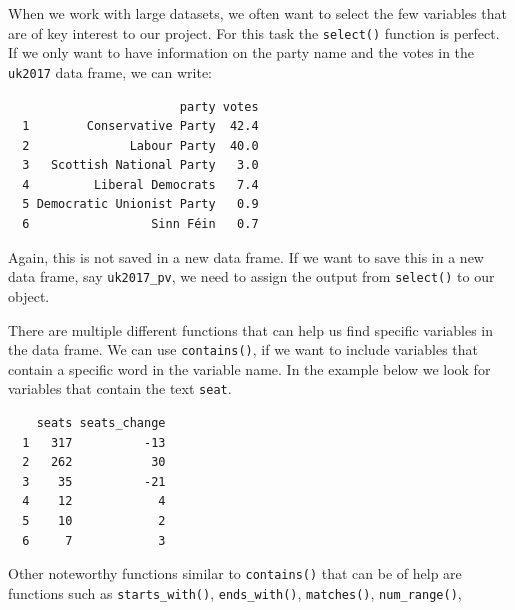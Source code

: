 \documentclass[12pt,oneside]{reedthesis}
\theoremstyle{definition}
\theoremstyle{definition}
\theoremstyle{definition}
\theoremstyle{remark}
\begin{document}
  When we work with large datasets, we often want to select the few
  variables that are of key interest to our project. For this task the
  \texttt{select()} function is perfect. If we only want to have
  information on the party name and the votes in the \texttt{uk2017} data
  frame, we can write:
  \begin{Shaded}
  \begin{Highlighting}[]
  \end{Highlighting}
  \end{Shaded}
  \begin{verbatim}
                        party votes
  1        Conservative Party  42.4
  2              Labour Party  40.0
  3   Scottish National Party   3.0
  4         Liberal Democrats   7.4
  5 Democratic Unionist Party   0.9
  6                 Sinn Féin   0.7
  \end{verbatim}
  Again, this is not saved in a new data frame. If we want to save this in
  a new data frame, say \texttt{uk2017\_pv}, we need to assign the output
  from \texttt{select()} to our object.
  \begin{Shaded}
  \begin{Highlighting}[]
  \StringTok{ }
  \end{Highlighting}
  \end{Shaded}
  There are multiple different functions that can help us find specific
  variables in the data frame. We can use \texttt{contains()}, if we want
  to include variables that contain a specific word in the variable name.
  In the example below we look for variables that contain the text
  \texttt{seat}.
  \begin{Shaded}
  \begin{Highlighting}[]
  \NormalTok{(}\NormalTok{))}
  \end{Highlighting}
  \end{Shaded}
  \begin{verbatim}
    seats seats_change
  1   317          -13
  2   262           30
  3    35          -21
  4    12            4
  5    10            2
  6     7            3
  \end{verbatim}
  Other noteworthy functions similar to \texttt{contains()} that can be of
  help are functions such as \texttt{starts\_with()},
  \texttt{ends\_with()}, \texttt{matches()}, \texttt{num\_range()},
\end{document}
